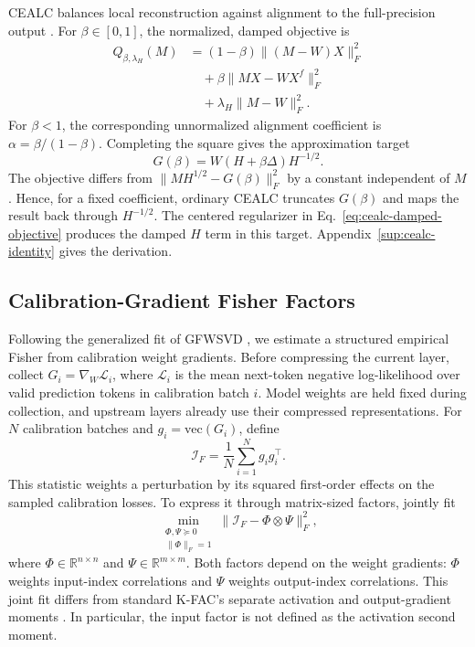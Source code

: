 \documentclass[11pt]{article}
\begin{document}
CEALC balances local reconstruction against alignment to the full-precision output \citep{hu2026saessvd}. For $\beta\in[0,1]$, the normalized, damped objective is
\begin{equation}
\begin{aligned}
Q_{\beta,\lambda_H}(M)
&=(1-\beta)\|(M-W)X\|_F^2\\
&\quad+\beta\|MX-WX^f\|_F^2\\
&\quad+\lambda_H\|M-W\|_F^2.
\end{aligned}
\label{eq:cealc-damped-objective}
\end{equation}
For $\beta<1$, the corresponding unnormalized alignment coefficient is $\alpha=\beta/(1-\beta)$. Completing the square gives the approximation target
\begin{equation}
G(\beta)=W(H+\beta\Delta)H^{-1/2}.
\label{eq:cealc-target}
\end{equation}
The objective differs from $\|MH^{1/2}-G(\beta)\|_F^2$ by a constant independent of $M$. Hence, for a fixed coefficient, ordinary CEALC truncates $G(\beta)$ and maps the result back through $H^{-1/2}$. The centered regularizer in Eq.~\eqref{eq:cealc-damped-objective} produces the damped $H$ term in this target. Appendix~\ref{sup:cealc-identity} gives the derivation.

\subsection{Calibration-Gradient Fisher Factors}\label{sec:fisher}

Following the generalized fit of GFWSVD \citep{chekalina2025gfwsvd}, we estimate a structured empirical Fisher from calibration weight gradients. Before compressing the current layer, collect $G_i=\nabla_W\mathcal L_i$, where $\mathcal L_i$ is the mean next-token negative log-likelihood over valid prediction tokens in calibration batch $i$. Model weights are held fixed during collection, and upstream layers already use their compressed representations. For $N$ calibration batches and $g_i=\mathrm{vec}(G_i)$, define
\begin{equation}
\mathcal I_F=\frac1N\sum_{i=1}^{N}g_i g_i^\top.
\label{eq:empirical-fisher}
\end{equation}
This statistic weights a perturbation by its squared first-order effects on the sampled calibration losses. To express it through matrix-sized factors, jointly fit
\begin{equation}
\min_{\substack{\Phi,\Psi\succeq0\\\|\Phi\|_F=1}}
\|\mathcal I_F-\Phi\otimes\Psi\|_F^2,
\label{eq:fisher-kron-fit}
\end{equation}
where $\Phi\in\mathbb R^{n\times n}$ and $\Psi\in\mathbb R^{m\times m}$. Both factors depend on the weight gradients: $\Phi$ weights input-index correlations and $\Psi$ weights output-index correlations. This joint fit differs from standard K-FAC's separate activation and output-gradient moments \citep{grosse2016kfac}. In particular, the input factor is not defined as the activation second moment.
\end{document}
